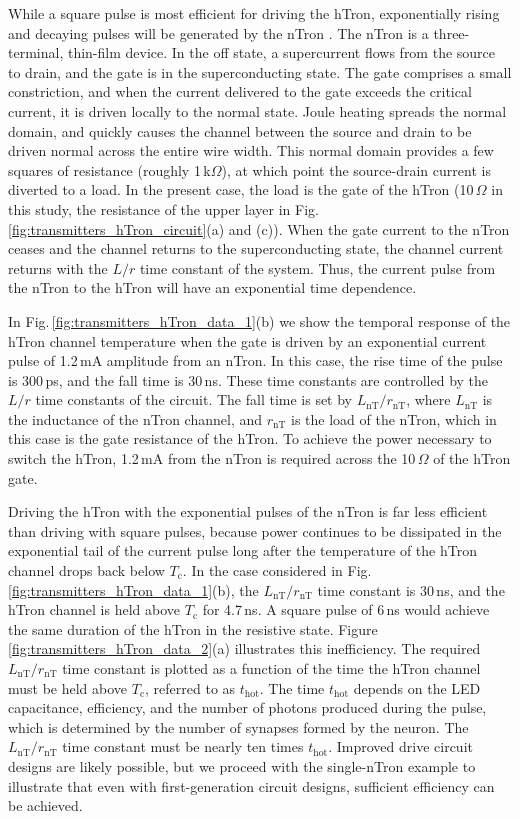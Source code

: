 \documentclass[twocolumn]{article}
\begin{document}
While a square pulse is most efficient for driving the hTron, exponentially rising and decaying pulses will be generated by the nTron \cite{mcbe2014}. The nTron is a three-terminal, thin-film device. In the off state, a supercurrent flows from the source to drain, and the gate is in the superconducting state. The gate comprises a small constriction, and when the current delivered to the gate exceeds the critical current, it is driven locally to the normal state. Joule heating spreads the normal domain, and quickly causes the channel between the source and drain to be driven normal across the entire wire width. This normal domain provides a few squares of resistance (roughly 1\,k$\Omega$), at which point the source-drain current is diverted to a load. In the present case, the load is the gate of the hTron (10\,$\Omega$ in this study, the resistance of the upper layer in Fig.\,\ref{fig:transmitters_hTron_circuit}(a) and (c)). When the gate current to the nTron ceases and the channel returns to the superconducting state, the channel current returns with the $L/r$ time constant of the system. Thus, the current pulse from the nTron to the hTron will have an exponential time dependence. 

In Fig.\,\ref{fig:transmitters_hTron_data_1}(b) we show the temporal response of the hTron channel temperature when the gate is driven by an exponential current pulse of 1.2\,mA amplitude from an nTron. In this case, the rise time of the pulse is 300\,ps, and the fall time is 30\,ns. These time constants are controlled by the $L/r$ time constants of the circuit. The fall time is set by $L_{\mathrm{nT}}/r_{\mathrm{nT}}$, where $L_{\mathrm{nT}}$ is the inductance of the nTron channel, and $r_{\mathrm{nT}}$ is the load of the nTron, which in this case is the gate resistance of the hTron. To achieve the power necessary to switch the hTron, 1.2\,mA from the nTron is required across the 10\,$\Omega$ of the hTron gate.

Driving the hTron with the exponential pulses of the nTron is far less efficient than driving with square pulses, because power continues to be dissipated in the exponential tail of the current pulse long after the temperature of the hTron channel drops back below $T_{\mathrm{c}}$. In the case considered in Fig.\,\ref{fig:transmitters_hTron_data_1}(b), the $L_{\mathrm{nT}}/r_{\mathrm{nT}}$ time constant is 30\,ns, and the hTron channel is held above $T_{\mathrm{c}}$ for 4.7\,ns. A square pulse of 6\,ns would achieve the same duration of the hTron in the resistive state. Figure \ref{fig:transmitters_hTron_data_2}(a) illustrates this inefficiency. The required $L_{\mathrm{nT}}/r_{\mathrm{nT}}$ time constant is plotted as a function of the time the hTron channel must be held above $T_{\mathrm{c}}$, referred to as $t_{\mathrm{hot}}$. The time $t_{\mathrm{hot}}$ depends on the LED capacitance, efficiency, and the number of photons produced during the pulse, which is determined by the number of synapses formed by the neuron. The $L_{\mathrm{nT}}/r_{\mathrm{nT}}$ time constant must be nearly ten times $t_{\mathrm{hot}}$. Improved drive circuit designs are likely possible, but we proceed with the single-nTron example to illustrate that even with first-generation circuit designs, sufficient efficiency can be achieved. 
\end{document}

